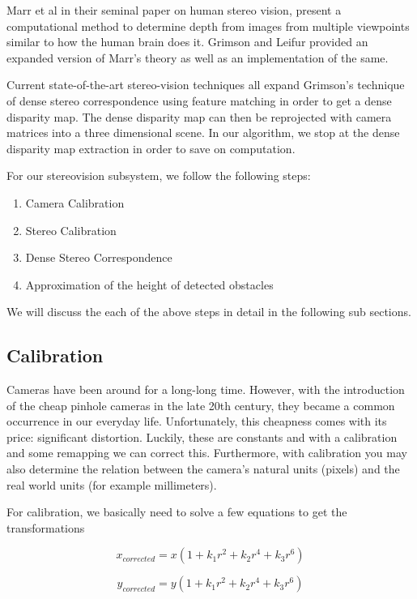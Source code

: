 \documentclass[11pt]{report}
\begin{document}
Marr et al\cite{marr1991computational} in their seminal paper on human stereo vision, present a computational method to determine depth from images from multiple viewpoints similar to how the human brain does it. Grimson and Leifur \cite{grimson1981computer} provided an expanded version of Marr's theory as well as an implementation of the same.

Current state-of-the-art stereo-vision techniques\cite{taxonomy} all expand Grimson's technique of dense stereo correspondence using feature matching in order to get a dense disparity map. The dense disparity map can then be reprojected with camera matrices into a three dimensional scene. In our algorithm, we stop at the dense disparity map extraction in order to save on computation.

For our stereovision subsystem, we follow the following steps:

\begin{enumerate}
\item Camera Calibration
\item Stereo Calibration
\item Dense Stereo Correspondence
\item Approximation of the height of detected obstacles
\end{enumerate} 

We will discuss the each of the above steps in detail in the following sub sections.
\label{calib}
\subsection{Calibration}

Cameras have been around for a long-long time. However, with the introduction of the cheap pinhole cameras in the late 20th century, they became a common occurrence in our everyday life. Unfortunately, this cheapness comes with its price: significant distortion. Luckily, these are constants and with a calibration and some remapping we can correct this. Furthermore, with calibration you may also determine the relation between the camera’s natural units (pixels) and the real world units (for example millimeters). 

For calibration, we basically need to solve a few equations to get the transformations

\begin{equation}
x_{corrected} = x(1+k_{1}r^{2}+k_{2}r^{4}+k_{3}r^{6})
\end{equation}


\begin{equation}
y_{corrected} = y(1+k_{1}r^{2}+k_{2}r^{4}+k_{3}r^{6})
\end{equation}
\end{document}
